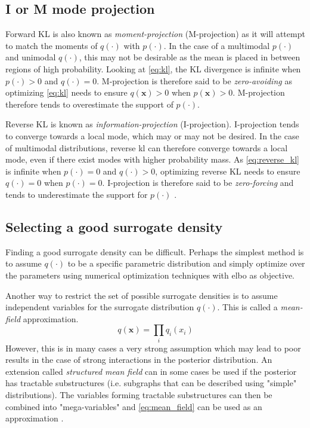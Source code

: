 \subsection{I or M mode projection}\label{sec:im-mode}

Forward KL is also known as \textit{moment-projection} (M-projection)  as it will attempt to match the moments of $q(\cdot)$ with $p(\cdot)$. In the case of a multimodal $p(\cdot)$ and unimodal $q(\cdot)$, this may not be desirable as the mean is placed in between regions of high probability. Looking at \cref{eq:kl}, the KL divergence is infinite when $p(\cdot) > 0$ and $q(\cdot) = 0$. M-projection is therefore said to be \textit{zero-avoiding} as optimizing \cref{eq:kl} needs to ensure $q(\mathbf{x}) > 0$ when $p(\mathbf{x}) > 0$. M-projection therefore tends to overestimate the support of $p(\cdot)$.

Reverse KL is known as \textit{information-projection} (I-projection). I-projection tends to converge towards a local mode, which may or may not be desired. In the case of multimodal distributions, reverse \acrshort{kl} can therefore converge towards a local mode, even if there exist modes with higher probability mass. As \cref{eq:reverse_kl} is infinite when $p(\cdot) = 0$ and $q(\cdot) > 0$, optimizing reverse KL needs to ensure $q(\cdot) = 0$ when $p(\cdot)=0$. I-projection is therefore said to be \textit{zero-forcing} and tends to underestimate the support for $p(\cdot)$ \cite{murphy}. 

\subsection{Selecting a good surrogate density}
Finding a good surrogate density can be difficult. Perhaps the simplest method is to assume $q(\cdot)$ to be a specific parametric distribution and simply optimize over the parameters using numerical optimization techniques with \acrshort{elbo} as objective. 

Another way to restrict the set of possible surrogate densities is to assume independent variables for the surrogate distribution $q(\cdot)$. This is called a \textit{mean-field} approximation.
\begin{equation}\label{eq:mean_field}
    q(\mathbf{x}) = \prod_i q_i(x_i)
\end{equation}
However, this is in many cases a very strong assumption which may lead to poor results in the case of strong interactions in the posterior distribution. An extension called \textit{structured mean field} can in some cases be used if the posterior has tractable substructures (i.e. subgraphs that can be described using "simple" distributions). The variables forming tractable substructures can then be combined into "mega-variables" and \cref{eq:mean_field} can be used as an approximation \cite{murphy}.

